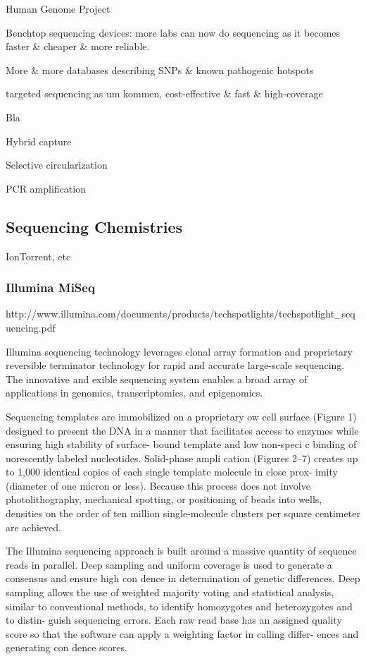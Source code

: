 Human Genome Project

Benchtop sequencing devices: more labs can now do sequencing as it becomes faster
\& cheaper \& more reliable.

More \& more databases describing SNPs \& known pathogenic hotspots

targeted sequencing as um kommen, cost-effective \& fast \& high-coverage

Bla {\cite{enrichment_methods:2011}}

Hybrid capture

Selective circularization

PCR amplification

\subsection{Sequencing Chemistries}

IonTorrent, etc

\subsubsection{Illumina MiSeq}

http://www.illumina.com/documents/products/techspotlights/techspotlight_sequencing.pdf

Illumina sequencing technology leverages clonal array formation and proprietary reversible terminator technology for rapid and accurate large-scale sequencing. The innovative and  exible sequencing system enables a broad array of applications in genomics, transcriptomics, and epigenomics.

Sequencing templates are immobilized on a proprietary  ow cell surface (Figure 1) designed to present the DNA in a manner that facilitates access to enzymes while ensuring high stability of surface- bound template and low non-speci c binding of  uorescently labeled nucleotides. Solid-phase ampli cation (Figures 2–7) creates up to 1,000 identical copies of each single template molecule in close prox- imity (diameter of one micron or less). Because this process does not involve photolithography, mechanical spotting, or positioning of beads into wells, densities on the order of ten million single-molecule clusters per square centimeter are achieved.

The Illumina sequencing approach is built around a massive quantity of sequence reads in parallel. Deep sampling and uniform coverage is used to generate a consensus and ensure high con dence in determination of genetic differences. Deep sampling allows the use of weighted majority voting and statistical analysis, similar to conventional methods, to identify homozygotes and heterozygotes and to distin- guish sequencing errors. Each raw read base has an assigned quality score so that the software can apply a weighting factor in calling differ- ences and generating con dence scores.

